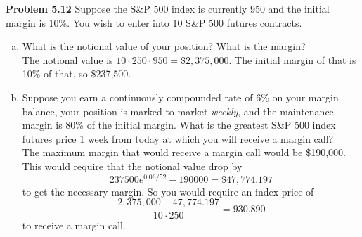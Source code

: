 \documentclass[12pt]{article}
\newcommand{\problem}[1]{\bigskip \noindent \textbf{Problem #1}}
\theoremstyle{plain}
\begin{document}
\problem{5.12} Suppose the S\&P 500 index is currently 950 and the initial margin is 10\%. You wish to enter into 10 S\&P 500 futures contracts.
\begin{enumerate}[(a)]
\item What is the notional value of your position? What is the margin?\\

The notional value is $10 \cdot 250 \cdot 950 = \$2,375,000$. The initial margin of that is 10\% of that, so \$237,500.

\item Suppose you earn a continuously compounded rate of 6\% on your margin balance, your position is marked to market \emph{weekly}, and the maintenance margin is 80\% of the initial margin. What is the greatest S\&P 500 index futures price 1 week from today at which you will receive a margin call?\\

The maximum margin that would receive a margin call would be \$190,000. This would require that the notional value drop by
\[
237500 e^{0.06/52} - 190000 = \$47,774.197
\]
to get the necessary margin. So you would require an index price of
\[
\frac{2,375,000 - 47,774.197}{10\cdot 250} = 930.890
\]
to receive a margin call.
\end{enumerate}
\end{document}
